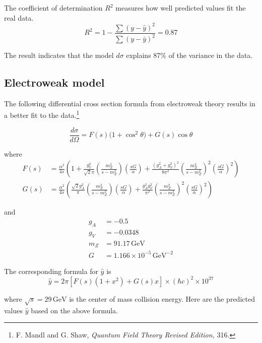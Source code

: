 \documentclass[12pt]{article}
\begin{document}
The coefficient of determination $R^2$ measures how well predicted values fit the real data.
\begin{equation*}
R^2=1-\frac{\sum(y-\hat{y})^2}{\sum(y-\bar{y})^2}=0.87
\end{equation*}

The result indicates that the model $d\sigma$ explains 87\% of the variance in the data.

\subsection*{Electroweak model}
The following differential cross section formula from electroweak
theory results in a better fit to the
data.\footnote{F. Mandl and G. Shaw, {\it Quantum Field Theory Revised Edition,} 316.}

\begin{equation*}
\frac{d\sigma}{d\Omega}=F(s)\big(1+\cos^2\theta\big)+G(s)\cos\theta
\end{equation*}

where
\begin{align*}
F(s)&=\frac{\alpha^2}{4s}
\left(
1+\frac{g_V^2}{\sqrt{2}\pi}\left(\frac{m_Z^2}{s-m_Z^2}\right)\left(\frac{sG}{\alpha}\right)
+\frac{(g_A^2+g_V^2)^2}{8\pi^2}\left(\frac{m_Z^2}{s-m_Z^2}\right)^2\left(\frac{sG}{\alpha}\right)^2
\right)
\\
G(s)&=\frac{\alpha^2}{4s}
\left(
\frac{\sqrt{2}g_A^2}{\pi}\left(\frac{m_Z^2}{s-m_Z^2}\right)\left(\frac{sG}{\alpha}\right)
+\frac{g_A^2g_V^2}{\pi^2}\left(\frac{m_Z^2}{s-m_Z^2}\right)^2\left(\frac{sG}{\alpha}\right)^2
\right)
\end{align*}

and
\begin{align*}
g_A&=-0.5
\\
g_V&=-0.0348
\\
m_Z&=91.17\,\text{GeV}
\\
G&=1.166\times10^{-5}\,\text{GeV}^{-2}
\end{align*}

The corresponding formula for $\hat{y}$ is
\begin{equation*}
\hat{y}=2\pi\left[F(s)(1+x^2)+G(s)x\right]\times(\hbar c)^2\times10^{37}
\end{equation*}

where $\sqrt{s}=29\,\text{GeV}$ is the center of mass collision energy.
Here are the predicted values $\hat{y}$ based on the above formula.
\end{document}
